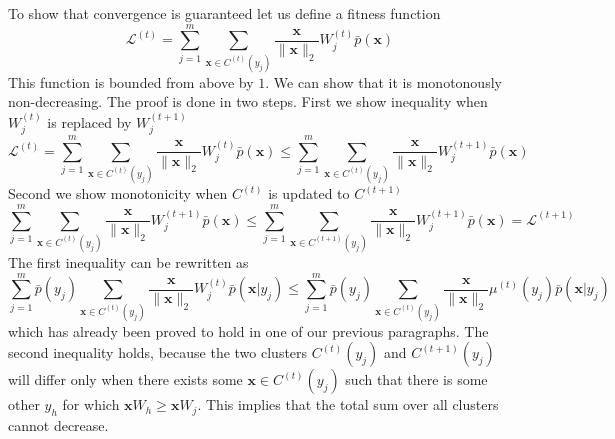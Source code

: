\documentclass[12pt]{article}
\begin{document}
To show that convergence is guaranteed let us define a fitness function
\[
\mathcal{L}^{(t)} = \sum_{j=1}^m \sum_{\boldsymbol{x}\in C^{(t)}(y_j)} \frac{\boldsymbol{x}}{\lVert \boldsymbol{x} \rVert_2} W_j^{(t)} \bar{p}(\boldsymbol{x})
\] 
This function is bounded from above by $1$. We can show that it is monotonously non-decreasing. The proof is done in two steps. First we show inequality when $W_j^{(t)}$  is replaced by $W_j^{(t+1)}$
\[\mathcal{L}^{(t)}= \sum_{j=1}^m \sum_{\boldsymbol{x}\in C^{(t)}(y_j)} \frac{\boldsymbol{x}}{\lVert \boldsymbol{x} \rVert_2} W_j^{(t)} \bar{p}(\boldsymbol{x}) \le \sum_{j=1}^m \sum_{\boldsymbol{x}\in C^{(t)}(y_j)} \frac{\boldsymbol{x}}{\lVert \boldsymbol{x} \rVert_2} W_j^{(t+1)} \bar{p}(\boldsymbol{x})\] 
Second we show monotonicity when $C^{(t)}$ is updated to $C^{(t+1)}$
\[\sum_{j=1}^m \sum_{\boldsymbol{x}\in C^{(t)}(y_j)} \frac{\boldsymbol{x}}{\lVert \boldsymbol{x} \rVert_2} W_j^{(t+1)} \bar{p}(\boldsymbol{x}) \le \sum_{j=1}^m \sum_{\boldsymbol{x}\in C^{(t+1)}(y_j)} \frac{\boldsymbol{x}}{\lVert \boldsymbol{x} \rVert_2} W_j^{(t+1)} \bar{p}(\boldsymbol{x})=\mathcal{L}^{(t+1)}\] 
The first inequality can be rewritten as 
\[\sum_{j=1}^m \bar{p}(y_j)  \sum_{\boldsymbol{x}\in C^{(t)}(y_j)} \frac{\boldsymbol{x}}{\lVert \boldsymbol{x} \rVert_2} W_j^{(t)} \bar{p}(\boldsymbol{x}|y_j) \le \sum_{j=1}^m \bar{p}(y_j) \sum_{\boldsymbol{x}\in C^{(t)}(y_j)} \frac{\boldsymbol{x}}{\lVert \boldsymbol{x} \rVert_2} \mu^{(t)}(y_j) \bar{p}(\boldsymbol{x}|y_j)\] 
which has already been proved to hold in one of our previous paragraphs.
The second inequality holds, because the two clusters $C^{(t)}(y_j)$ and  $C^{(t+1)}(y_j)$ will differ only when there exists some $\boldsymbol{x}\in C^{(t)}(y_j)$ such that there is some other $y_h$ for which $\boldsymbol{x}W_h \ge \boldsymbol{x} W_j$. This implies that the total sum over all clusters cannot decrease.
\end{document}
